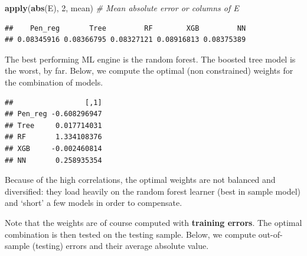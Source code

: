\documentclass[]{krantz}
\makeatletter
\newenvironment{Shaded}{\begin{snugshade}}{\end{snugshade}}
\newcommand{\CommentTok}[1]{\textcolor[rgb]{0.37,0.37,0.37}{\textit{#1}}}
\newcommand{\DecValTok}[1]{\textcolor[rgb]{0.06,0.06,0.06}{#1}}
\newcommand{\KeywordTok}[1]{\textcolor[rgb]{0.27,0.27,0.27}{\textbf{#1}}}
\newcommand{\NormalTok}[1]{#1}
\newcommand{\OperatorTok}[1]{\textcolor[rgb]{0.43,0.43,0.43}{\textbf{#1}}}
\newcommand{\StringTok}[1]{\textcolor[rgb]{0.5,0.5,0.5}{#1}}
\newenvironment{kframe}{%
\medskip{}
\setlength{\fboxsep}{.8em}
 \def\at@end@of@kframe{}%
 \ifinner\ifhmode%
  \def\at@end@of@kframe{\end{minipage}}%
  \begin{minipage}{\columnwidth}%
 \fi\fi%
 \def\FrameCommand##1{\hskip\@totalleftmargin \hskip-\fboxsep
 \colorbox{shadecolor}{##1}\hskip-\fboxsep
     \hskip-\linewidth \hskip-\@totalleftmargin \hskip\columnwidth}%
 \MakeFramed {\advance\hsize-\width
   \@totalleftmargin\z@ \linewidth\hsize
   \@setminipage}}%
 {\par\unskip\endMakeFramed%
 \at@end@of@kframe}
\renewenvironment{Shaded}{\begin{kframe}}{\end{kframe}}
\theoremstyle{definition}
\theoremstyle{definition}
\theoremstyle{definition}
\theoremstyle{remark}
\makeatother
\begin{document}
\footnotesize

\begin{Shaded}
\begin{Highlighting}[]
\KeywordTok{apply}\NormalTok{(}\KeywordTok{abs}\NormalTok{(E), }\DecValTok{2}\NormalTok{, mean) }\CommentTok{# Mean absolute error or columns of E }
\end{Highlighting}
\end{Shaded}

\begin{verbatim}
##    Pen_reg       Tree         RF        XGB         NN 
## 0.08345916 0.08366795 0.08327121 0.08916813 0.08375389
\end{verbatim}

\normalsize

The best performing ML engine is the random forest. The boosted tree
model is the worst, by far. Below, we compute the optimal (non
constrained) weights for the combination of models.

\footnotesize

\begin{Shaded}
\end{Shaded}

\begin{verbatim}
##                 [,1]
## Pen_reg -0.608296947
## Tree     0.017714031
## RF       1.334108376
## XGB     -0.002460814
## NN       0.258935354
\end{verbatim}

\normalsize

Because of the high correlations, the optimal weights are not balanced
and diversified: they load heavily on the random forest learner (best in
sample model) and `short' a few models in order to compensate.

Note that the weights are of course computed with \textbf{training
errors}. The optimal combination is then tested on the testing sample.
Below, we compute out-of-sample (testing) errors and their average
absolute value.
\end{document}
